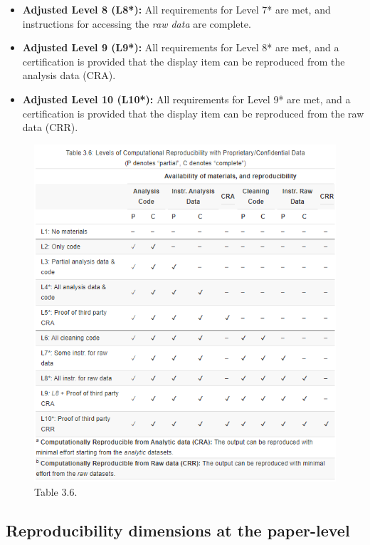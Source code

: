 \documentclass[
  openany]{book}
\begin{document}
\begin{itemize}
\item
  \textbf{Adjusted Level 8 (L8*):} All requirements for Level 7* are met, and instructions for accessing the \emph{raw data} are complete.
\item
  \textbf{Adjusted Level 9 (L9*):} All requirements for Level 8* are met, and a certification is provided that the display item can be reproduced from the analysis data (CRA).
\item
  \textbf{Adjusted Level 10 (L10*):} All requirements for Level 9* are met, and a certification is provided that the display item can be reproduced from the raw data (CRR).
\end{itemize}

\begin{figure}
\centering
\includegraphics{docs/Table_LevelsOfComputationalReproducibilityWithProprietaryConfidentialData.png}
\caption{Table 3.6.}
\end{figure}

\hypertarget{reproducibility-dimensions-at-the-paper-level}{%
\subsection{Reproducibility dimensions at the paper-level}\label{reproducibility-dimensions-at-the-paper-level}}
\end{document}
